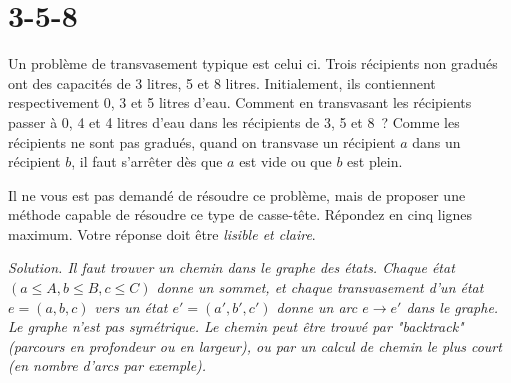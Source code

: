 \documentclass[11pt]{article}
\begin{document}
\else\fi

\section{3-5-8}
Un problème de transvasement  typique est celui ci. 
Trois récipients non gradués ont des capacités de 3 litres, 5  et 8 litres.
Initialement, ils contiennent respectivement 0,  3 et 5 litres d'eau. Comment en transvasant les
récipients passer à 0, 4 et 4 litres d'eau dans les récipients de 3, 5 et 8~?
Comme les récipients ne sont pas gradués, quand on transvase un récipient $a$
dans un récipient $b$, 
il faut s'arrêter dès que $a$ est vide ou que $b$ est plein. 

Il ne vous est pas demandé de résoudre ce problème,  mais de 
proposer une méthode capable de résoudre ce type de casse-tête.
Répondez en cinq lignes maximum. Votre réponse doit être {\it lisible et claire}.

\ifcorrige 
{\it Solution. Il faut trouver un chemin dans le graphe des états.
Chaque état $(a\le A, b\le B, c\le C)$ donne un sommet, et chaque transvasement
d'un état $e=(a, b, c)$ vers un état $e'=(a', b', c')$ donne un arc $e\rightarrow e'$ dans le graphe.
Le graphe n'est pas symétrique.
Le chemin peut être trouvé par "backtrack" (parcours en profondeur ou en largeur), ou par un calcul de chemin le plus court (en nombre d'arcs par exemple).
}
\else
\fi
\end{document}
